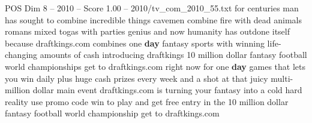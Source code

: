 \begin{textsample}{POS Dim 8 – 2010 – Score 1.00 – 2010/tv\_com\_2010\_55.txt}  \label{ex:f8_pos_059}
for centuries man has sought to combine incredible things cavemen combine fire with dead animals romans mixed togas with parties genius and now humanity has outdone itself because draftkings.com combines one \textbf{day} fantasy sports with winning life-changing amounts of cash introducing draftkings 10 million dollar fantasy football world championships get to draftkings.com right now for one \textbf{day} games that lets you win daily plus huge cash prizes every week and a shot at that juicy multi-million dollar main event draftkings.com is turning your fantasy into a cold hard reality use promo code win to play and get free entry in the 10 million dollar fantasy football world championship get to draftkings.com

\end{textsample}

